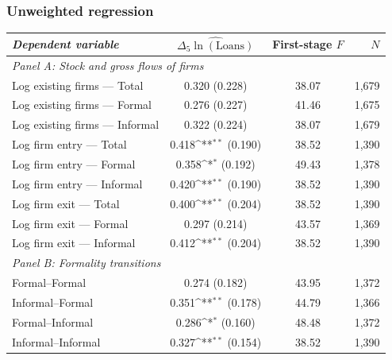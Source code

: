 \documentclass[aspectratio=169]{beamer}
\newcommand{\sym}[1]{\ifmmode^{#1}\else\(^{#1}\)\fi}
\begin{document}

\begin{frame}[noframenumbering]
\frametitle{\textbf{Unweighted regression}} \label{unweighted}

\begin{center}
    \scriptsize
    \begin{tabular}{lccr}
        \toprule
        \textit{Dependent variable} & $\widehat{\Delta_5\ln(\text{Loans})}$ & First-stage $F$ & $N$ \\
        \midrule
        \multicolumn{4}{l}{\textit{Panel A: Stock and gross flows of firms}} \\
        Log existing firms --- Total    & \phantom{$-$}0.320          (0.228) & 38.07 & 1{,}679 \\
        Log existing firms --- Formal   & \phantom{$-$}0.276          (0.227) & 41.46 & 1{,}675 \\
        Log existing firms --- Informal & \phantom{$-$}0.322          (0.224) & 38.07 & 1{,}679 \\
        Log firm entry --- Total        & \phantom{$-$}0.418\sym{**}  (0.190) & 38.52 & 1{,}390 \\
        Log firm entry --- Formal       & \phantom{$-$}0.358\sym{*}   (0.192) & 49.43 & 1{,}378 \\
        Log firm entry --- Informal     & \phantom{$-$}0.420\sym{**}  (0.190) & 38.52 & 1{,}390 \\
        Log firm exit --- Total         & \phantom{$-$}0.400\sym{**}  (0.204) & 38.52 & 1{,}390 \\
        Log firm exit --- Formal        & \phantom{$-$}0.297          (0.214) & 43.57 & 1{,}369 \\
        Log firm exit --- Informal      & \phantom{$-$}0.412\sym{**}  (0.204) & 38.52 & 1{,}390 \\
        \midrule
        \multicolumn{4}{l}{\textit{Panel B: Formality transitions}} \\
        Formal--Formal                  & \phantom{$-$}0.274          (0.182) & 43.95 & 1{,}372 \\
        Informal--Formal                & \phantom{$-$}0.351\sym{**}  (0.178) & 44.79 & 1{,}366 \\
        Formal--Informal                & \phantom{$-$}0.286\sym{*}   (0.160) & 48.48 & 1{,}372 \\
        Informal--Informal              & \phantom{$-$}0.327\sym{**}  (0.154) & 38.52 & 1{,}390 \\  
    \bottomrule
\end{tabular}
\end{center}

\hyperlink{robustness}{}

\end{frame}
\end{document}
